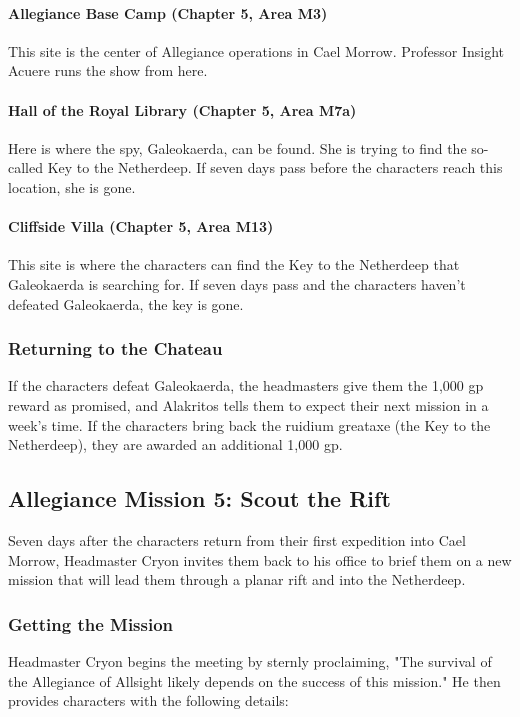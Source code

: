 \documentclass[10pt,a4paper,twoside,twocolumn,openany,nodeprecatedcode]{dndbook}
\begin{document}
\paragraph{Allegiance Base Camp (Chapter 5, Area M3)}
This site is the center of Allegiance operations in Cael Morrow. Professor Insight Acuere runs the show from here.

\paragraph{Hall of the Royal Library (Chapter 5, Area M7a)}
Here is where the spy, Galeokaerda, can be found. She is trying to find the so-called Key to the Netherdeep. If seven days pass before the characters reach this location, she is gone.

\paragraph{Cliffside Villa (Chapter 5, Area M13)}
This site is where the characters can find the Key to the Netherdeep that Galeokaerda is searching for. If seven days pass and the characters haven't defeated Galeokaerda, the key is gone.

\subsubsection{Returning to the Chateau}
If the characters defeat Galeokaerda, the headmasters give them the 1,000 gp reward as promised, and Alakritos tells them to expect their next mission in a week's time. If the characters bring back the ruidium greataxe (the Key to the Netherdeep), they are awarded an additional 1,000 gp.

\subsection{Allegiance Mission 5: Scout the Rift}
Seven days after the characters return from their first expedition into Cael Morrow, Headmaster Cryon invites them back to his office to brief them on a new mission that will lead them through a planar rift and into the Netherdeep.

\subsubsection{Getting the Mission}
Headmaster Cryon begins the meeting by sternly proclaiming, "The survival of the Allegiance of Allsight likely depends on the success of this mission." He then provides characters with the following details:
\end{document}
